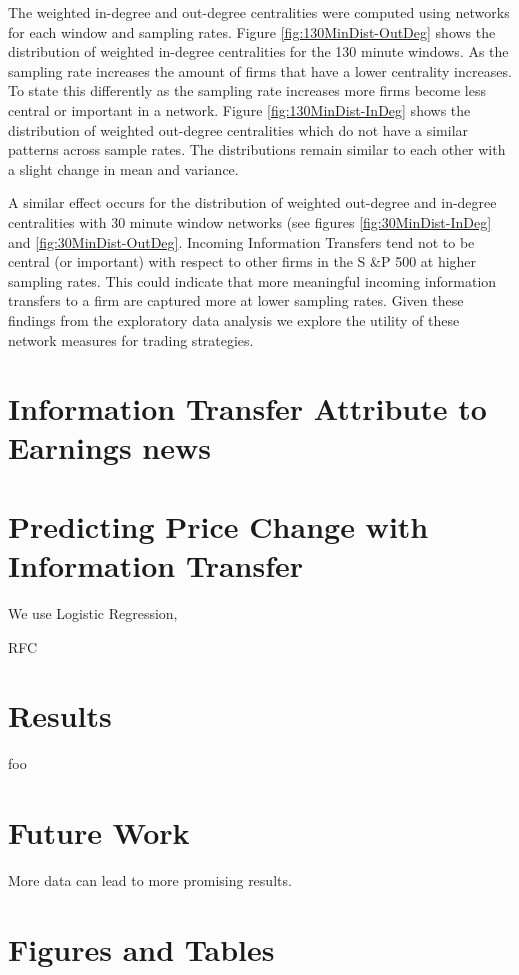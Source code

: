 The weighted in-degree and out-degree centralities were computed using networks for each window and sampling rates.  Figure \ref{fig:130MinDist-OutDeg}  shows the distribution of weighted in-degree centralities for the 130 minute windows.  As the sampling rate increases the amount of firms that have a lower centrality increases.  To state this differently as the sampling rate increases more firms become less central or important in a network.  Figure \ref{fig:130MinDist-InDeg} shows the distribution of weighted out-degree centralities which do not have a similar patterns across sample rates.  The distributions remain similar to each other with a slight change in mean and variance. 

A similar effect occurs for the distribution of weighted out-degree and in-degree centralities with 30 minute window networks (see figures \ref{fig:30MinDist-InDeg} and \ref{fig:30MinDist-OutDeg}.  Incoming Information Transfers tend not to be central (or important) with respect to other firms in the S \&P 500 at higher sampling rates.  This could indicate that more meaningful incoming information transfers to a firm are captured more at lower sampling rates.   Given these findings from the exploratory data analysis we explore the utility of these network measures for trading strategies.


\section{Information Transfer Attribute to Earnings news}



\section{Predicting Price Change with Information Transfer}
We use Logistic Regression, 

RFC


\section{Results}
foo


\section{Future Work}
More data can lead to more promising results.

\section{Figures and Tables}

